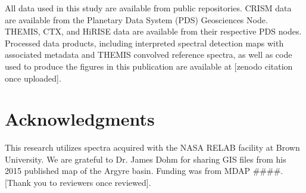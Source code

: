 \documentclass[11pt]{article}
\begin{document}
All data used in this study are available from public repositories. CRISM data are available from the Planetary Data System (PDS) Geosciences Node. THEMIS, CTX, and HiRISE data are available from their respective PDS nodes. Processed data products, including interpreted spectral detection maps with associated metadata and THEMIS convolved reference spectra, as well as code used to produce the figures in this publication are available at [zenodo citation once uploaded].

\section*{Acknowledgments}

This research utilizes spectra acquired with the NASA RELAB facility at Brown University. We are grateful to Dr. James Dohm for sharing GIS files from his 2015 published map of the Argyre basin. Funding was from MDAP \#\#\#\#. [Thank you to reviewers once reviewed].
\end{document}
